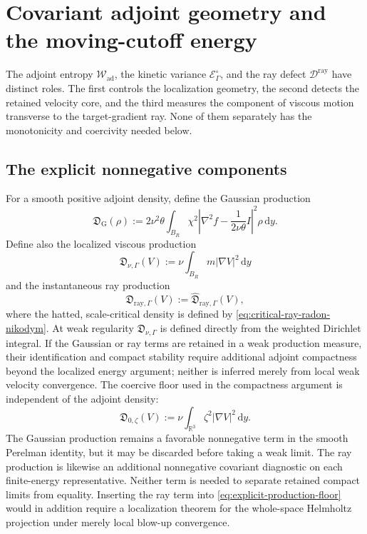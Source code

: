 \documentclass[11pt]{amsart}
\numberwithin{equation}{section}
\theoremstyle{plain}
\theoremstyle{definition}
\theoremstyle{remark}
\newcommand{\R}{\mathbb R}
\newcommand{\dd}{\,\mathrm d}
\newcommand{\RayDefect}{\mathscr D^{\mathrm{ray}}}
\newcommand{\OscEnergy}{\mathcal E^{\circ}}
\begin{document}
\section{Covariant adjoint geometry and the moving-cutoff energy}
\label{sec:corrected-entropy}

The adjoint entropy \(\mathcal W_{\mathrm{ad}}\), the kinetic variance
\(\OscEnergy_\Gamma\), and the ray defect \(\RayDefect\) have distinct
roles.  The first controls the localization geometry, the second detects the
retained velocity core, and the third measures the component of viscous
motion transverse to the target-gradient ray.  None of them separately has
the monotonicity and coercivity needed below.

\subsection{The explicit nonnegative components}

For a smooth positive adjoint density, define the Gaussian production
\begin{equation}\label{eq:gaussian-production}
 \mathfrak D_{\mathrm G}(\rho)
 :=2\nu^2\theta\int_{B_R}\chi^2
 \left|\nabla^2f-\frac{1}{2\nu\theta}I\right|^2\rho\dd y.
\end{equation}
Define also the localized viscous production
\begin{equation}\label{eq:localized-viscous-production}
 \mathfrak D_{\nu,\Gamma}(V)
 :=\nu\int_{B_R}m|\nabla V|^2\dd y
\end{equation}
and the instantaneous ray production
\begin{equation}\label{eq:instantaneous-ray-production}
 \mathfrak D_{\mathrm{ray},\Gamma}(V)
 :=\widehat{\mathfrak D}_{\mathrm{ray},\Gamma}(V),
\end{equation}
where the hatted, scale-critical density is defined by
\eqref{eq:critical-ray-radon-nikodym}.
At weak regularity \(\mathfrak D_{\nu,\Gamma}\) is defined directly from the
weighted Dirichlet integral.  If the Gaussian or ray terms are retained in a
weak production measure, their identification and compact stability require
additional adjoint compactness beyond the localized energy argument; neither is inferred merely
from local weak velocity convergence.  The coercive floor used in the
compactness argument is independent of the adjoint density:
\begin{equation}\label{eq:explicit-production-floor}
 \mathfrak D_{0,\zeta}(V)
 :=\nu\int_{\R^3}\zeta^2|\nabla V|^2\dd y.
\end{equation}
The Gaussian production remains a favorable nonnegative term in the smooth
Perelman identity, but it may be discarded before taking a weak limit.  The
ray production is likewise an additional nonnegative covariant diagnostic on
each finite-energy representative.  Neither term is needed to separate
retained compact limits from equality.  Inserting the ray term into
\eqref{eq:explicit-production-floor} would in addition require a localization
theorem for the whole-space Helmholtz projection under merely local blow-up
convergence.
\end{document}
